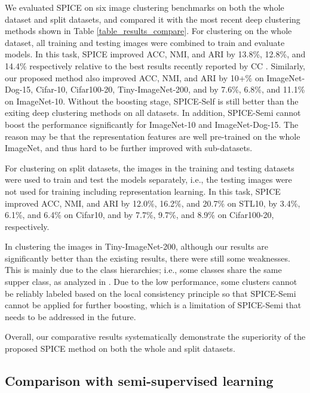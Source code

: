 \documentclass[10pt,twocolumn,letterpaper]{article}
\begin{document}
We evaluated SPICE on six image clustering benchmarks on both the whole dataset and split datasets, and compared it with the most recent deep clustering methods shown in Table \ref{table_results_compare}.
For clustering on the whole dataset, all training and testing images were combined to train and evaluate models. In this task, SPICE improved ACC, NMI, and ARI by 13.8\%, 12.8\%, and 14.4\% respectively relative to the best results recently reported by CC \cite{cc}. Similarly, our proposed method also improved ACC, NMI, and ARI by 10+\% on ImageNet-Dog-15, Cifar-10, Cifar100-20, Tiny-ImageNet-200, and by 7.6\%, 6.8\%, and 11.1\% on ImageNet-10. Without the boosting stage, SPICE-Self is still better than the exiting deep clustering methods on all datasets. In addition, SPICE-Semi cannot  boost the performance significantly for ImageNet-10 and ImageNet-Dog-15. The reason may be that the representation features are well pre-trained on the whole ImageNet, and thus hard to be further improved with sub-datasets.

For clustering on split datasets, the images in the training and testing datasets were used to train and test the models separately, i.e., the testing images were not used for  training  including representation learning. In this task, SPICE improved ACC, NMI, and ARI by 12.0\%, 16.2\%, and 20.7\% on STL10, by 3.4\%, 6.1\%, and 6.4\% on Cifar10, and by 7.7\%, 9.7\%, and 8.9\% on Cifar100-20, respectively.

In clustering the images in Tiny-ImageNet-200, although our results are significantly better than the existing results, there were still some weaknesses. This is mainly due to the class hierarchies; i.e., some classes share the same supper class, as analyzed in \cite{scan}. Due to the low performance, some clusters cannot be reliably labeled based on the local consistency principle so that SPICE-Semi cannot be applied for further boosting, which is a limitation of SPICE-Semi that needs to be addressed in the future.

Overall, our  comparative results systematically demonstrate the superiority of the proposed SPICE method on both the whole and split datasets.

\subsection{Comparison with semi-supervised learning}
\end{document}
